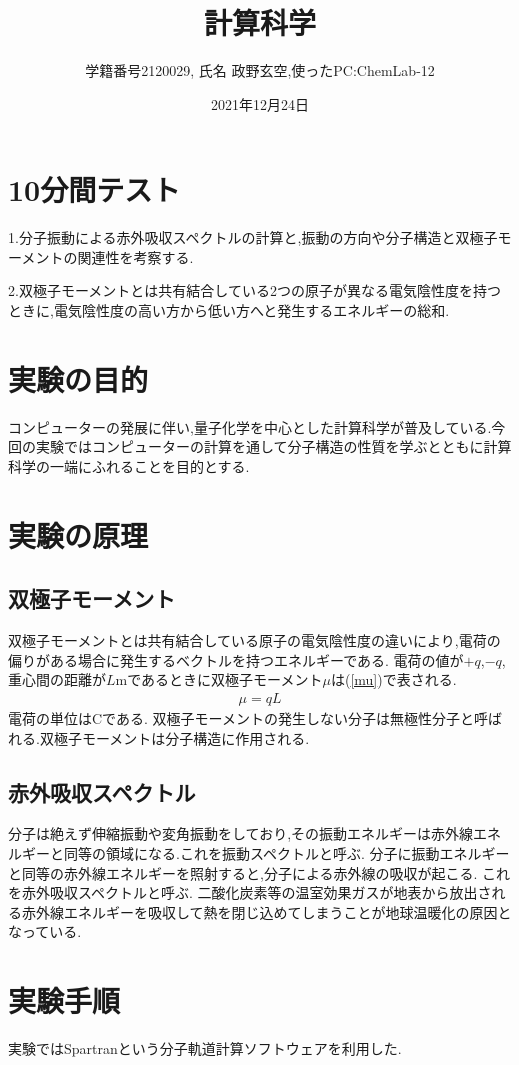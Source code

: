 \documentclass[a4j,10pt,dvipdfmx]{jarticle}
\title{計算科学}
\author{学籍番号2120029, 氏名 政野玄空,使ったPC:ChemLab-12}
\date{2021年12月24日}
\begin{document}
\maketitle
\section{10分間テスト}
  1.分子振動による赤外吸収スペクトルの計算と,振動の方向や分子構造と双極子モーメントの関連性を考察する.


  2.双極子モーメントとは共有結合している2つの原子が異なる電気陰性度を持つときに,電気陰性度の高い方から低い方へと発生するエネルギーの総和.
  \section{実験の目的}
  コンピューターの発展に伴い,量子化学を中心とした計算科学が普及している.今回の実験ではコンピューターの計算を通して分子構造の性質を学ぶとともに計算科学の一端にふれることを目的とする.
  \section{実験の原理}
  \subsection{双極子モーメント}
  双極子モーメントとは共有結合している原子の電気陰性度の違いにより,電荷の偏りがある場合に発生するベクトルを持つエネルギーである.
  電荷の値が$+q$,$-q$,重心間の距離が$L$mであるときに双極子モーメント$\mu$は(\ref{mu})で表される.
  \begin{eqnarray}
    \label{mu}
    \mu = qL
  \end{eqnarray}
  電荷の単位はCである.
  双極子モーメントの発生しない分子は無極性分子と呼ばれる.双極子モーメントは分子構造に作用される.
  \subsection{赤外吸収スペクトル}
  分子は絶えず伸縮振動や変角振動をしており,その振動エネルギーは赤外線エネルギーと同等の領域になる.これを振動スペクトルと呼ぶ.
  分子に振動エネルギーと同等の赤外線エネルギーを照射すると,分子による赤外線の吸収が起こる.
  これを赤外吸収スペクトルと呼ぶ.
  二酸化炭素等の温室効果ガスが地表から放出される赤外線エネルギーを吸収して熱を閉じ込めてしまうことが地球温暖化の原因となっている.
  \section{実験手順}
  実験ではSpartranという分子軌道計算ソフトウェアを利用した.
\end{document}
